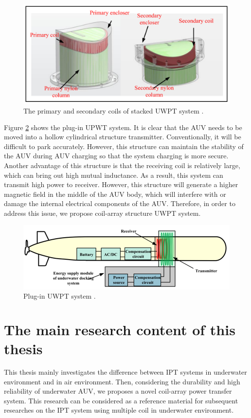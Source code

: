 \begin{figure}[!b]
    \centering
    \includegraphics[width=0.7\linewidth]{images/1_stacked_UWPT_system_details.png}
    \caption{The primary and secondary coils of stacked UWPT system \cite{Song}.}
    \label{fig:stacked UWPT system detail}
\end{figure}

Figure \ref{fig:plug in UWPT system} shows the plug-in UPWT system. 
It is clear that the AUV needs to be moved into a hollow cylindrical structure transmitter.
Conventionally, it will be difficult to park accurately. 
However, this structure can maintain the stability of the AUV during AUV charging so that the system charging is more secure. 
Another advantage of this structure is that the receiving coil is relatively large, which can bring out high mutual inductance. 
As a result, this system can transmit high power to receiver.
However, this structure will generate a higher magnetic field in the middle of the AUV body, which will interfere with or damage the internal electrical components of the AUV.
Therefore, in order to address this issue, we propose coil-array structure UWPT system.
\begin{figure}[!t]
    \centering
    \includegraphics[width=0.7\linewidth]{images/1_plugin_UWPT_system.png}
    \caption{Plug-in UWPT system \cite{Wang2019}.}
    \label{fig:plug in UWPT system}
\end{figure}


\section{The main research content of this thesis}
This thesis mainly investigates the difference between IPT systems in underwater environment and in air environment. 
Then, considering the durability and high reliability of underwater AUV, we proposes a novel coil-array power transfer system. 
This research can be considered as a reference material for subsequent researches on the IPT system using multiple coil in underwater environment.

